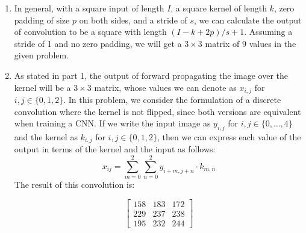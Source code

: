 \documentclass[a4paper]{article}
\begin{document}
\begin{enumerate}
\item{In general, with a square input of length $I$, a square kernel of length $k$, zero padding of size $p$ on both sides, and a stride of $s$, we can calculate the output of convolution to be a square with length $(I-k+2p)/s + 1$. Assuming a stride of 1 and no zero padding, we will get a $3 \times 3$ matrix of $9$ values in the given problem.}
\item{
As stated in part 1, the output of forward propagating the image over the kernel will be a $3 \times 3$ matrix, whose values we can denote as $x_{i,j}$ for $i,j \in \{0,1,2 \}$. In this problem, we consider the formulation of a discrete convolution where the kernel is not flipped, since both versions are equivalent when training a CNN. If we write the input image as $y_{i,j}$ for $i,j \in \{ 0,\dots,4\}$ and the kernel as $k_{i,j}$ for $i,j \in \{0,1,2 \}$, then we can express each value of the output in terms of the kernel and the input as follows:
$$
x_{ij} = \sum_{m=0}^2 \sum_{n=0}^2 y_{i+m,j+n} \cdot k_{m,n}
$$
The result of this convolution is:

$$
\begin{bmatrix}
158 & 183 & 172 \\
229 & 237 & 238 \\
195 & 232 & 244 
\end{bmatrix}
$$

}
\end{enumerate}
\end{document}
